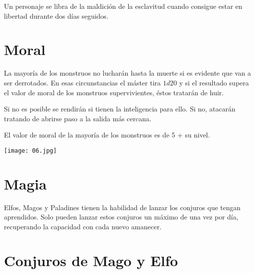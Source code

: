 \begin{multicols}{2}
\begin{enumerate}[label={\alph*)}]
\end{enumerate}


Un personaje se libra de la maldición de la esclavitud cuando consigue estar
en libertad durante dos días seguidos.

\section{Moral}

La mayoría de los monstruos no lucharán hasta la muerte si es evidente que van a
ser derrotados. En esas circunstancias el máster tira $ 1d20$ y si el resultado
supera el valor de moral de los monstruos supervivientes, éstos tratarán de huir.

Si no es posible se rendirán si tienen la inteligencia para ello. Si no, atacarán
tratando de abrirse paso a la salida más cercana.

El valor de moral de la mayoría de los monstruos es de 5 + su nivel.

\vspace{1pc}
\texttt{[image: 06.jpg]}

\section{Magia}

Elfos, Magos y Paladines tienen la habilidad de lanzar los conjuros que tengan
aprendidos. Solo pueden lanzar estos conjuros un máximo de una vez por día,
recuperando la capacidad con cada nuevo amanecer.

\section{Conjuros de Mago y Elfo}


\end{multicols}
